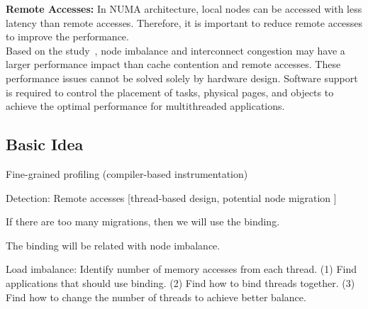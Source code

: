 \textbf{Remote Accesses:} In NUMA architecture, local nodes can be accessed with less latency than remote accesses. Therefore, it is important to reduce remote accesses to improve the performance.\\


 Based on the study~\cite{Blagodurov:2011:CNC:2002181.2002182}, node imbalance and interconnect congestion may have a larger performance impact than cache contention and remote accesses. These performance issues cannot be solved solely by hardware design. Software support is required to control the placement of tasks, physical pages, and objects to achieve the optimal performance for multithreaded applications.  
 
\subsection{Basic Idea}

Fine-grained profiling (compiler-based instrumentation) 

Detection: 
Remote accesses [thread-based design, potential node migration ]

If there are too many migrations, then we will use the binding. 

The binding will be related with node imbalance. 

Load imbalance: 
Identify number of memory accesses from each thread. 
(1) Find applications that should use binding. 
(2) Find how to bind threads together. 
(3) Find how to change the number of threads to achieve better balance. 

